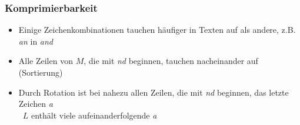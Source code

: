 \documentclass[14pt,xcolor=dvipsnames,pdftex]{beamer}
\begin{document}
\begin{frame}
 \frametitle{Komprimierbarkeit}
 \begin{itemize}
  \item Einige Zeichenkombinationen tauchen häufiger in Texten auf als andere, z.B. \textit{an} in \textit{and}
  \item Alle Zeilen von $M$, die mit \textit{nd} beginnen, tauchen nacheinander auf (Sortierung)
  \item Durch Rotation ist bei nahezu allen Zeilen, die mit \textit{nd} beginnen, das letzte Zeichen \textit{a}\\
  \textrightarrow\ $L$ enthält viele aufeinanderfolgende \textit{a}
 \end{itemize}
\end{frame}

\end{document}
